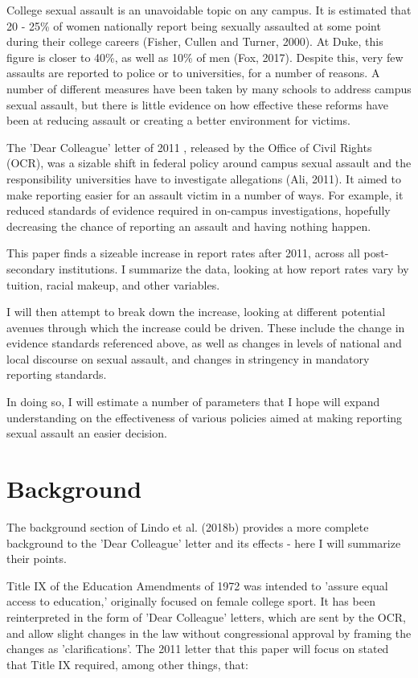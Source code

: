 \documentclass[AER]{AEA}
\begin{document}
\clearpage

College sexual assault is an unavoidable topic on any campus. It is estimated that 20 - 25\% of women nationally report being sexually assaulted at some point during their college careers (Fisher, Cullen and Turner, 2000). At Duke, this figure is closer to 40\%, as well as 10\% of men (Fox, 2017). Despite this, very few assaults are reported to police or to universities, for a number of reasons. A number of different measures have been taken by many schools to address campus sexual assault, but there is little evidence on how effective these reforms have been at reducing assault or creating a better environment for victims. 

The 'Dear Colleague' letter of 2011 , released by the Office of Civil Rights (OCR), was a sizable shift in federal policy around campus sexual assault and the responsibility universities have to investigate allegations (Ali, 2011). It aimed to make reporting easier for an assault victim in a number of ways. For example, it reduced standards of evidence required in on-campus investigations, hopefully decreasing the chance of reporting an assault and having nothing happen. 

This paper finds a sizeable increase in report rates after 2011, across all post-secondary institutions. I summarize the data, looking at how report rates vary by tuition, racial makeup, and other variables.

I will then attempt to break down the increase, looking at different potential avenues through which the increase could be driven. These include the change in evidence standards referenced above, as well as changes in levels of national and local discourse on sexual assault, and changes in stringency in mandatory reporting standards.

In doing so, I will estimate a number of parameters that I hope will expand understanding on the effectiveness of various policies aimed at making reporting sexual assault an easier decision.


\section{Background}

The background section of Lindo et al. (2018b) provides a more complete background to the 'Dear Colleague' letter and its effects - here I will summarize their points. 

Title IX of the Education Amendments of 1972 was intended to 'assure equal access to education,' originally focused on female college sport. It has been reinterpreted in the form of 'Dear Colleague' letters, which are sent by the OCR, and allow slight changes in the law without congressional approval by framing the changes as 'clarifications'. The 2011 letter that this paper will focus on stated that Title IX required, among other things, that:
\end{document}
